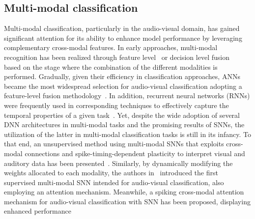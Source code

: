 \subsection{Multi-modal classification}

Multi-modal classification, particularly in the audio-visual domain, has gained significant attention for its ability to enhance model performance by leveraging complementary cross-modal features.
In early approaches, multi-modal recognition has been realized through feature level~\cite{natarajan2012multimodal} or decision level fusion~\cite{ebrahimi2015recurrent} based on the stage where the combination of the different modalities is performed. 
Gradually, given their efficiency in classification approaches, ANNs became the most widespread selection for audio-visual classification adopting a feature-level fusion methodology~\cite{metallinou2012context,eyben2011audiovisual,8937495}.
In addition, recurrent neural networks (RNNs) were frequently used in corresponding techniques to effectively capture the temporal properties of a given task~\cite{feng2017audio,makino2019recurrent}.
Yet, despite the wide adoption of several DNN architectures in multi-modal tasks and the promising results of SNNs, the utilization of the latter in multi-modal classification tasks is still in its infancy.
To that end, an unsupervised method using multi-modal SNNs that exploits cross-modal connections and spike-timing-dependent plasticity to interpret visual and auditory data has been presented~\cite{rathi2018stdp}.
Similarly, by dynamically modifying the weights allocated to each modality, the authors in~\cite{liu2022event} introduced the first supervised multi-modal SNN intended for audio-visual classification, also employing an attention mechanism.
Meanwhile, a spiking cross-modal attention mechanism for audio-visual classification with SNN has been proposed, displaying enhanced performance~\cite{10293172}

